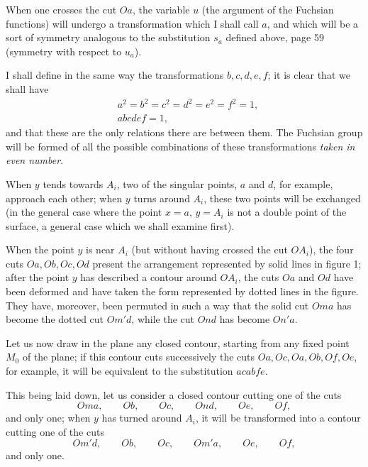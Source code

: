 \documentclass{article}
\begin{document}
When one crosses the cut $Oa$, the variable $u$ (the argument of the Fuchsian functions) will undergo a transformation which I shall call $a$, and which will be a sort of symmetry analogous to the substitution $s_{a}$ defined above, page 59 (symmetry with respect to $u_{a}$).

I shall define in the same way the transformations $b, c, d, e, f$; it is clear that we shall have
\[ \begin{aligned} &a^{2} = b^{2} = c^{2} = d^{2} = e^{2} = f^{2} = 1,\\ &abcdef = 1, \end{aligned} \]
and that these are the only relations there are between them. The Fuchsian group will be formed of all the possible combinations of these transformations \emph{taken in even number}.

When $y$ tends towards $A_{i}$, two of the singular points, $a$ and $d$, for example, approach each other; when $y$ turns around $A_{i}$, these two points will be exchanged (in the general case where the point $x = a$, $y = A_{i}$ is not a double point of the surface, a general case which we shall examine first).

When the point $y$ is near $A_{i}$ (but without having crossed the
cut $OA_{i}$), the four cuts $Oa, Ob, Oc, Od$ present the arrangement represented by solid lines in figure 1; after the point $y$ has described a contour around $OA_{i}$, the cuts $Oa$ and $Od$ have been deformed and have taken the form represented by dotted
lines in the figure. They have, moreover, been permuted in such a way that the solid cut $Oma$ has become the dotted cut $Om'd$, while the cut $Ond$ has become $On'a$.

Let us now draw in the plane any closed contour, starting from any fixed point $M_{0}$ of the plane; if this contour cuts successively the cuts $Oa, Oc, Oa, Ob, Of, Oe$, for example, it will be equivalent to the substitution $acabfe$.

This being laid down, let us consider a closed contour cutting one of the cuts
\[ Oma, \qquad Ob, \qquad Oc, \qquad Ond, \qquad Oe, \qquad Of, \tag{1} \]
and only one; when $y$ has turned around $A_{i}$, it will be transformed into a contour cutting one of the cuts
\[ Om'd, \qquad Ob, \qquad Oc, \qquad Om'a, \qquad Oe, \qquad Of, \tag{2} \]
and only one.
\end{document}
